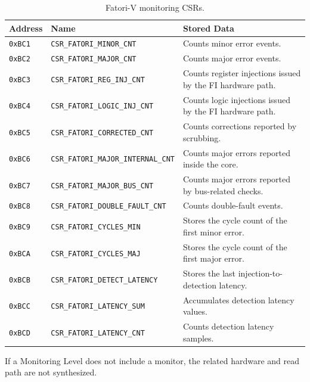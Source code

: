 \begin{table}[h]
\centering
\small
\setlength{\tabcolsep}{3.2pt}
\renewcommand{\arraystretch}{1.25}
\begin{tabularx}{\textwidth}{|l|l|X|}
\hline
\rowcolor{tableheader}\textbf{Address} &
\textbf{Name} &
\textbf{Stored Data} \\
\hline
\hline
\texttt{0xBC1} &
\texttt{CSR\_FATORI\_MINOR\_CNT} &
Counts minor error events. \\
\hline
\texttt{0xBC2} &
\texttt{CSR\_FATORI\_MAJOR\_CNT} &
Counts major error events. \\
\hline
\texttt{0xBC3} &
\texttt{CSR\_FATORI\_REG\_INJ\_CNT} &
Counts register injections issued by the \ac{FI} hardware path. \\
\hline
\texttt{0xBC4} &
\texttt{CSR\_FATORI\_LOGIC\_INJ\_CNT} &
Counts logic injections issued by the \ac{FI} hardware path. \\
\hline
\texttt{0xBC5} &
\texttt{CSR\_FATORI\_CORRECTED\_CNT} &
Counts corrections reported by scrubbing. \\
\hline
\texttt{0xBC6} &
\texttt{CSR\_FATORI\_MAJOR\_INTERNAL\_CNT} &
Counts major errors reported inside the core. \\
\hline
\texttt{0xBC7} &
\texttt{CSR\_FATORI\_MAJOR\_BUS\_CNT} &
Counts major errors reported by bus-related checks. \\
\hline
\texttt{0xBC8} &
\texttt{CSR\_FATORI\_DOUBLE\_FAULT\_CNT} &
Counts double-fault events. \\
\hline
\texttt{0xBC9} &
\texttt{CSR\_FATORI\_CYCLES\_MIN} &
Stores the cycle count of the first minor error. \\
\hline
\texttt{0xBCA} &
\texttt{CSR\_FATORI\_CYCLES\_MAJ} &
Stores the cycle count of the first major error. \\
\hline
\texttt{0xBCB} &
\texttt{CSR\_FATORI\_DETECT\_LATENCY} &
Stores the last injection-to-detection latency. \\
\hline
\texttt{0xBCC} &
\texttt{CSR\_FATORI\_LATENCY\_SUM} &
Accumulates detection latency values. \\
\hline
\texttt{0xBCD} &
\texttt{CSR\_FATORI\_LATENCY\_CNT} &
Counts detection latency samples. \\
\hline
\end{tabularx}
\caption{\ac{Fatori-V} monitoring \acp{CSR}.}
\label{tab:fatori_ft_csrs}
\end{table}

If a Monitoring Level does not include a monitor, the related hardware and read path are not synthesized.



